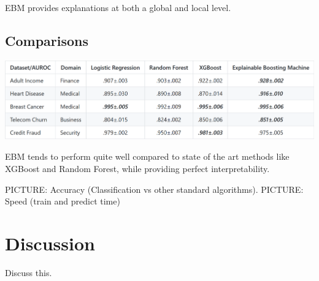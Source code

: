 \documentclass[twoside,11pt]{article}
\begin{document}
EBM provides explanations at both a global and local level. 

\subsection{Comparisons}

\includegraphics[scale=0.65]{performance_comparison.PNG}

EBM tends to perform quite well compared to state of the art methods like XGBoost and Random Forest, while providing perfect interpretability. 

PICTURE: Accuracy (Classification vs other standard algorithms). 
PICTURE: Speed (train and predict time)

\section{Discussion}
Discuss this.



\newpage
\end{document}
